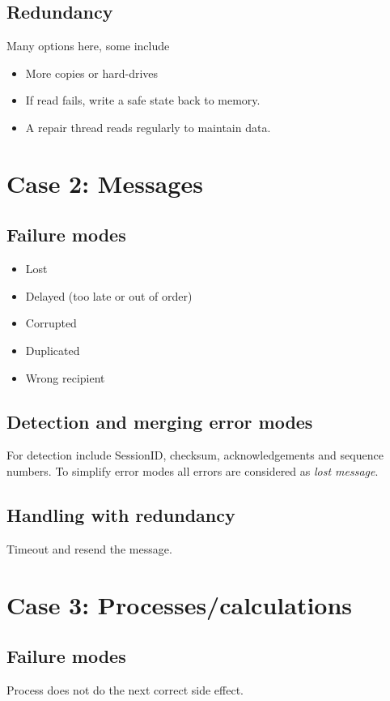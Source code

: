 \subsection{Redundancy}
Many options here, some include
\begin{itemize}
\item More copies or hard-drives
\item If read fails, write a safe state back to memory.
\item A repair thread reads regularly to maintain data.
\end{itemize}

\section{Case 2: Messages}
\subsection{Failure modes}
\begin{itemize}
\item Lost
\item Delayed (too late or out of order)
\item Corrupted
\item Duplicated
\item Wrong recipient
\end{itemize}

\subsection{Detection and merging error modes}
For detection include SessionID, checksum, acknowledgements and sequence numbers. To simplify error modes all errors are considered as \textit{lost message}.

\subsection{Handling with redundancy}
Timeout and resend the message.

\section{Case 3: Processes/calculations}
\subsection{Failure modes}
Process does not do the next correct side effect.

